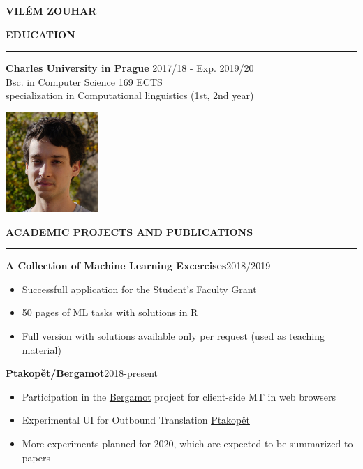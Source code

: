 \documentclass[11pt,a4paper]{article} %
\newcommand{\hSection}[1]{
    \medskip
    \MakeUppercase{\bf #1}
    \medskip
    \hrule
}
\newcommand{\hSubsectionI}[2]{{\bf #1}\hfill {#2}\hspace{-1cm}}
\begin{document}
\begin{center}
    {\LARGE \bf VILÉM ZOUHAR} \\
    {\large \href{mailto:vilem.zouhar@mff.cuni.cz}{\color{black}{vilem.zouhar@mff.cuni.cz}}}
\end{center}

\vspace{1.9cm}

\begin{minipage}{0.75\textwidth}
    \hSection{Education}\vspace{0.2cm}
    {\bf Charles University in Prague} \hfill {2017/18 - Exp. 2019/20} \\
    Bsc. in Computer Science \hfill 169 ECTS \\
    specialization in Computational linguistics \hfill (1st, 2nd year)
\end{minipage}
\begin{minipage}{0.25\textwidth}
  \vspace{-2cm}
  \hfill
  \includegraphics[width=3.5cm]{portrait.jpg}
  \vspace{-0.9cm}
\end{minipage}

\hSection{Academic Projects and Publications}

\hSubsectionI{A Collection of Machine Learning Excercises}{2018/2019}

\begin{itemize}
    \item Successfull application for the Student's Faculty Grant
    \item 50 pages of ML tasks with solutions in R
    \item Full version with solutions available only per request (used as \href{http://ufal.mff.cuni.cz/courses/npfl054}{teaching material})
\end{itemize}

\hSubsectionI{Ptakopět/Bergamot}{2018-present}

\begin{itemize}
    \item Participation in the \href{http://browser.mt/}{Bergamot} project for client-side MT in web browsers
    \item Experimental UI for Outbound Translation \href{https://github.com/zouharvi/ptakopet}{Ptakopět}
    \item More experiments  planned for 2020, which are expected to be summarized to papers
\end{itemize}
\end{document}
